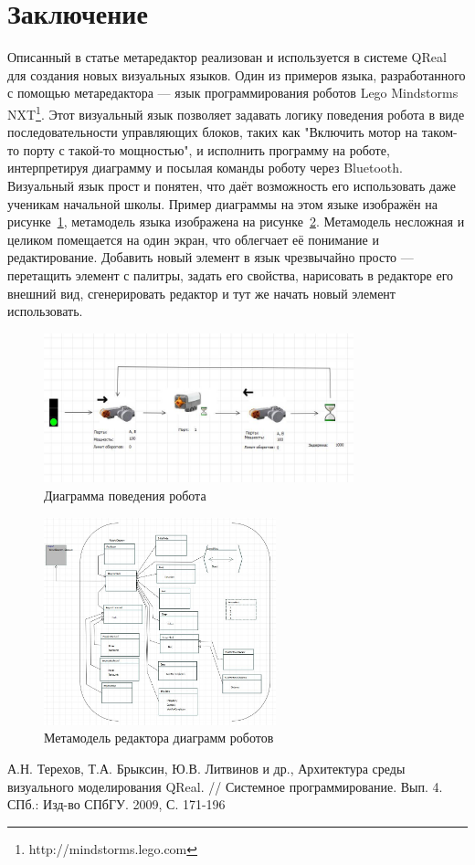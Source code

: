 \documentclass[a4paper]{article}
\begin{document}
\section{Заключение}
Описанный в статье метаредактор реализован и используется в системе QReal для создания новых визуальных языков. Один из примеров языка, разработанного с помощью метаредактора --- язык программирования роботов Lego Mindstorms NXT\footnote{http://mindstorms.lego.com}. Этот визуальный язык позволяет задавать логику поведения робота в виде последовательности управляющих блоков, таких как "Включить мотор на таком-то порту с такой-то мощностью", и исполнить программу на роботе, интерпретируя диаграмму и посылая команды роботу через Bluetooth. Визуальный язык прост и понятен, что даёт возможность его использовать даже ученикам начальной школы. Пример диаграммы на этом языке изображён на рисунке~\ref{robotsDiagram}, метамодель языка изображена на рисунке~\ref{robotsMetamodel}. Метамодель несложная и целиком помещается на один экран, что облегчает её понимание и редактирование. Добавить новый элемент в язык чрезвычайно просто --- перетащить элемент с палитры, задать его свойства, нарисовать в редакторе его внешний вид, сгенерировать редактор и тут же начать новый элемент использовать.

\begin{figure} [ht]
  \begin{center}
    \includegraphics[width=0.8\textwidth]{robotsDiagram.jpg}
    \caption{Диаграмма поведения робота}
    \label{robotsDiagram}
  \end{center}
\end{figure}

\begin{figure} [ht]
  \begin{center}
    \includegraphics[width=0.6\textwidth]{robotsMetamodel.jpg}
    \caption{Метамодель редактора диаграмм роботов}
    \label{robotsMetamodel}
  \end{center}
\end{figure}

\begin{thebibliography}{9001}
   А.Н. Терехов, Т.А. Брыксин, Ю.В. Литвинов и др., Архитектура среды визуального моделирования QReal. // Системное программирование. Вып. 4. СПб.: Изд-во СПбГУ. 2009, С. 171-196
\end{thebibliography}
\end{document}
